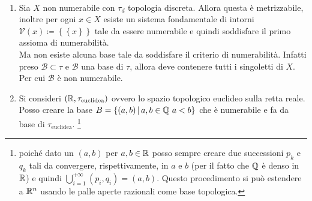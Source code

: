 \begin{example}	\
\begin{enumerate}
	\item Sia $X$ non numerabile con $\tau_d$ topologia discreta. Allora questa è metrizzabile, inoltre per ogni $x\in X$ esiste un sistema fondamentale di intorni $\mathcal{V}(x) \coloneqq \left\{ \left\{x \right\} \right\}$ tale da essere numerabile e quindi soddisfare il primo assioma di numerabilità. \\ Ma non esiste alcuna base tale da soddisfare il  criterio di numerabilità. Infatti preso $\mathcal{B} \subset \tau$ e $\mathcal{B}$ una base di $\tau$, allora deve contenere tutti i singoletti di $X$. Per cui $\mathcal{B}$ è non numerabile.
	\item Si consideri $(\mathbb{R}, \tau_{\text{euclidea}})$ ovvero lo spazio topologico euclideo sulla retta reale. Posso creare la base $B = \left\{(a,b) \,\middle|\, a,b \in \mathbb{Q}\ a < b\right\}$  che è numerabile e fa da base di $\tau_{\text{euclidea}}$. \footnote{poiché dato un $(a,b)$ per $a,b \in \mathbb{R}$ posso sempre creare due successioni $p_k$ e $q_k$ tali da convergere, rispettivamente, in $a$ e $b$  (per il fatto che $\mathbb{Q}$ è denso in $\mathbb{R}$) e quindi $\bigcup_{i=1}^{+\infty}(p_i, q_i) = (a,b)$. Questo procedimento si può estendere a $\mathbb{R}^n$ usando le palle aperte razionali come base topologica.}
\end{enumerate}
\end{example}


